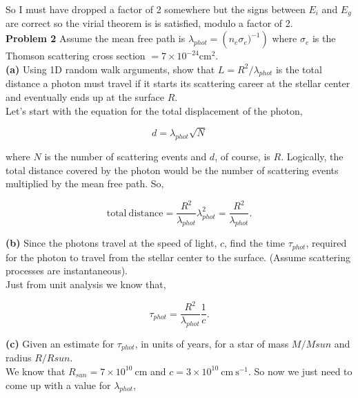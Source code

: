 \documentclass[12pt]{article}
\begin{document}
\noindent So I must have dropped a factor of 2 somewhere but the signs between $E_i$ and $E_g$ are correct so the virial theorem is is satisfied, modulo a factor of 2.\\

\noindent \textbf{Problem 2} Assume the mean free path is $\lambda_{phot} = \left ( n_e\sigma_e)^{-1}\right)$ where $\sigma_e$ is the Thomson scattering cross section $ = 7 \times 10^{-24} \mathrm{cm}^2$.\\

\noindent \textbf{(a)} Using 1D random walk arguments, show that $L=R^2 / \lambda_{phot}$ is the total distance a photon must travel if it starts its scattering career at the stellar center and eventually ends up at the surface $R$. \\

\noindent Let's start with the equation for the total displacement of the photon,

\begin{equation}
d = \lambda_{phot}\sqrt{N}
\end{equation}

\noindent where $N$ is the number of scattering events and $d$, of course, is $R$. Logically, the total distance covered by the photon would be the number of scattering events multiplied by the mean free path. So,

\begin{equation}
\mathrm{total~distance} = \frac{R^2}{\lambda_{phot}}\lambda_{phot}^2 =  \frac{R^2}{\lambda_{phot}} .
\end{equation}

\noindent \textbf{(b)} Since the photons travel at the speed of light, $c$, find the time $\tau_{phot}$, required for the photon to travel from the stellar center to the surface. (Assume scattering processes are instantaneous).  \\

\noindent Just from unit analysis we know that,

\begin{equation}
\tau_{phot} = \frac{R^2}{\lambda_{phot}} \frac{1}{c}.
\end{equation}

\noindent \textbf{(c)} Given an estimate for  $\tau_{phot}$, in units of years, for a star of mass $M/M{sun}$ and radius $R/R{sun}$. \\

\noindent We know that $R_{sun} = 7 \times 10^{10} ~\mathrm{cm}$ and $c = 3 \times 10^{10} ~\mathrm{cm ~s^{-1}}$. So now we just need to come up with a value for $\lambda_{phot}$,
\end{document}
